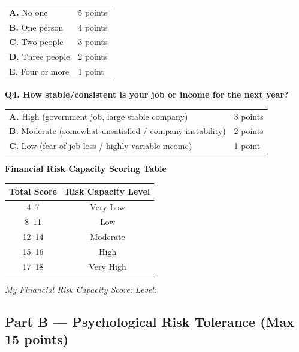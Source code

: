 \documentclass[12pt,a4paper]{article}
\begin{document}
\begin{tcolorbox}[base, colback=CapacityColor!7, colframe=CapacityColor, breakable]
\medskip
\begin{tabular}{ll}
\textbf{A.} No one & 5 points\\
\textbf{B.} One person & 4 points\\
\textbf{C.} Two people & 3 points\\
\textbf{D.} Three people & 2 points\\
\textbf{E.} Four or more & 1 point\\
\end{tabular}

\bigskip
\textbf{\color{CapacityColor}Q4. How stable/consistent is your job or income for the next year?}

\medskip
\begin{tabular}{ll}
\textbf{A.} High (government job, large stable company) & 3 points\\
\textbf{B.} Moderate (somewhat unsatisfied / company instability) & 2 points\\
\textbf{C.} Low (fear of job loss / highly variable income) & 1 point\\
\end{tabular}
\end{tcolorbox}

\vspace{2mm}

\begin{tcolorbox}[base, colback=CapacityColor!7, colframe=CapacityColor]
\centering
\textbf{\color{CapacityColor}Financial Risk Capacity Scoring Table}

\medskip
\begin{tabular}{cc}
\toprule
\textbf{Total Score} & \textbf{Risk Capacity Level}\\
\midrule
4--7 & Very Low\\
8--11 & Low\\
12--14 & Moderate\\
15--16 & High\\
17--18 & Very High\\
\bottomrule
\end{tabular}

\medskip
\textit{My Financial Risk Capacity Score: }\underline{\hspace{2cm}}
\quad
\textit{Level: }\underline{\hspace{3cm}}
\end{tcolorbox}

\vspace{4mm}

\subsection{Part B --- Psychological Risk Tolerance (Max 15 points)}
\end{document}
